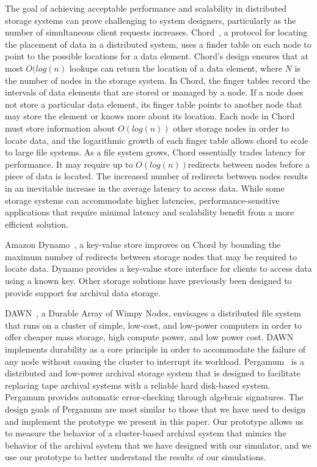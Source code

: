 The goal of achieving acceptable performance and scalability in distributed storage systems can prove challenging to system designers, particularly as the number of simultaneous client requests increases.  Chord~\cite{ref2}, a protocol for locating the placement of data in a distributed system, uses a finder table on each node to point to the possible locations for a data element.  Chord's design ensures that at most $O(log (n)$ lookups can return the location of a data element, where $N$ is the number of nodes in the storage system.  In Chord, the finger tables record the intervals of data elements that are stored or managed by a node.  If a node does not store a particular data element, its finger table points to another node that may store the element or knows more about its location.  Each node in Chord must store information about $O(log(n))$ other storage nodes in order to locate data, and the logarithmic growth of each finger table allows chord to scale to large file systems.  As a file system grows, Chord essentially trades latency for performance.  It may require up to $O(log(n))$redirects between nodes before a piece of data is located.  The increased number of redirects between nodes results in an inevitable increase in the average latency to access data.  While some storage systems can accommodate higher latencies, performance-sensitive applications that require minimal latency and scalability benefit from a more efficient solution.

Amazon Dynamo~\cite{ref3}, a key-value store improves on Chord by bounding the maximum number of redirects between storage nodes that may be required to locate data.  Dynamo provides a key-value store interface for clients to access data using a known key.  Other storage solutions have previously been designed to provide support for archival data storage.

DAWN~\cite{adams-ssrctr-11-07}, a Durable Array of Wimpy Nodes, envisages a distributed file system that runs on a cluster of simple, low-cost, and low-power computers in order to offer cheaper mass storage, high compute power, and low power cost.  DAWN implements durability as a core principle in order to accommodate the failure of any node without causing the cluster to interrupt its workload.  Pergamum~\cite{storer:fast08} is a distributed and low-power archival storage system that is designed to facilitate replacing tape archival systems with a reliable hard disk-based system.  Pergamum provides automatic error-checking through algebraic signatures.  The design goals of Pergamum are most similar to those that we have used to design and implement the prototype we present in this paper.  Our prototype allows us to measure the behavior of a cluster-based archival system that mimics the behavior of the archival system that we have designed with our simulator, and we use our prototype to better understand the results of our simulations.

